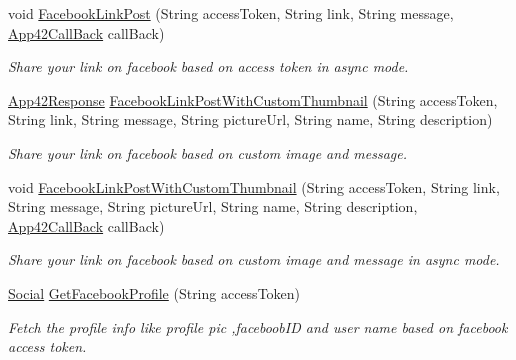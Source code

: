 \begin{DoxyCompactItemize}
void \hyperlink{classcom_1_1shephertz_1_1app42_1_1paas_1_1sdk_1_1csharp_1_1social_1_1_social_service_af1dd8fa331b9b7f7ec6cc5207ba9e622}{Facebook\+Link\+Post} (String access\+Token, String link, String message, \hyperlink{interfacecom_1_1shephertz_1_1app42_1_1paas_1_1sdk_1_1csharp_1_1_app42_call_back}{App42\+Call\+Back} call\+Back)
\begin{DoxyCompactList}\small\item\em Share your link on facebook based on access token in async mode. \end{DoxyCompactList}\item 
\hyperlink{classcom_1_1shephertz_1_1app42_1_1paas_1_1sdk_1_1csharp_1_1_app42_response}{App42\+Response} \hyperlink{classcom_1_1shephertz_1_1app42_1_1paas_1_1sdk_1_1csharp_1_1social_1_1_social_service_afeec1b28e9433d89dc5ab21c8301b8e4}{Facebook\+Link\+Post\+With\+Custom\+Thumbnail} (String access\+Token, String link, String message, String picture\+Url, String name, String description)
\begin{DoxyCompactList}\small\item\em Share your link on facebook based on custom image and message. \end{DoxyCompactList}\item 
void \hyperlink{classcom_1_1shephertz_1_1app42_1_1paas_1_1sdk_1_1csharp_1_1social_1_1_social_service_af23e62811f636259c11a735458eae62e}{Facebook\+Link\+Post\+With\+Custom\+Thumbnail} (String access\+Token, String link, String message, String picture\+Url, String name, String description, \hyperlink{interfacecom_1_1shephertz_1_1app42_1_1paas_1_1sdk_1_1csharp_1_1_app42_call_back}{App42\+Call\+Back} call\+Back)
\begin{DoxyCompactList}\small\item\em Share your link on facebook based on custom image and message in async mode. \end{DoxyCompactList}\item 
\hyperlink{classcom_1_1shephertz_1_1app42_1_1paas_1_1sdk_1_1csharp_1_1social_1_1_social}{Social} \hyperlink{classcom_1_1shephertz_1_1app42_1_1paas_1_1sdk_1_1csharp_1_1social_1_1_social_service_a9b0ef398eb6f644b305ce3fa56ca0f98}{Get\+Facebook\+Profile} (String access\+Token)
\begin{DoxyCompactList}\small\item\em Fetch the profile info like profile pic ,faceboob\+I\+D and user name based on facebook access token. \end{DoxyCompactList}\item 

\end{DoxyCompactItemize}
